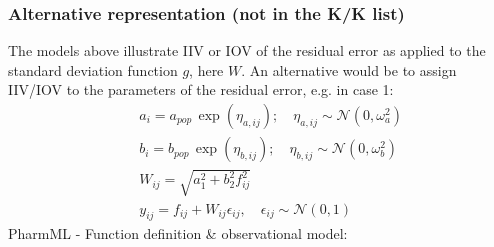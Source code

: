 \documentclass[a4paper,10pt]{article}
\begin{document}
\subsubsection{Alternative representation (not in the K/K list)}
The models above illustrate IIV or IOV of the residual error as applied to the standard deviation function $g$, here $W$.
An alternative would be to assign IIV/IOV to the parameters of the residual error, e.g. in case 1:
\begin{eqnarray}
&& a_i = a_{pop}\, \exp(\eta_{a,ij}); \quad \eta_{a,ij} \sim \mathcal{N}(0,\omega_a^2) \nonumber \\
&& b_i = b_{pop}\, \exp(\eta_{b,ij}); \quad \eta_{b,ij} \sim \mathcal{N}(0,\omega_b^2) \nonumber \\
&& W_{ij} = \sqrt{a_1^2 + b_2^2 f_{ij}^2} \nonumber \\
&& y_{ij} = f_{ij} + W_{ij} \epsilon_{ij}, \quad \epsilon_{ij} \sim \mathcal{N}(0,1)	\nonumber
\end{eqnarray}
PharmML - Function definition \& observational model:
\end{document}
